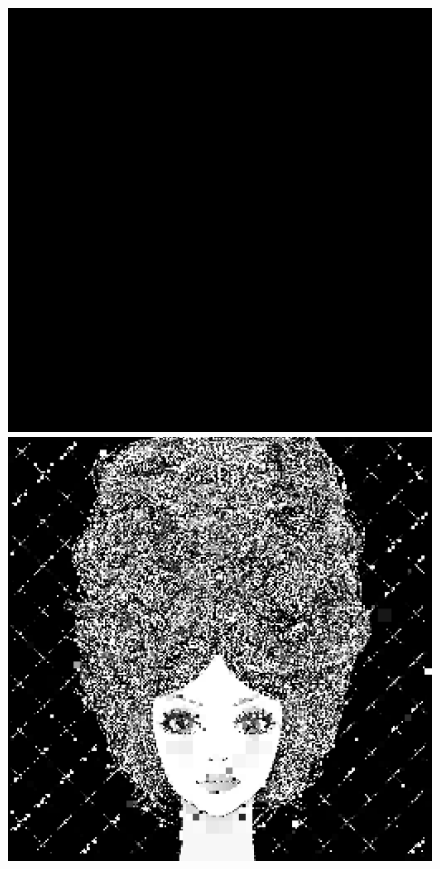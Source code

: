 \documentclass[11pt,a4paper,appendixprefix=true,numbers=noenddot]{scrreprt}
\begin{document}
\begin{figure}[!ht]
\centering
\includegraphics[scale=0.35]{images/girl01} 
\includegraphics[scale=0.35]{images/girl02} 

\end{figure}
\end{document}
